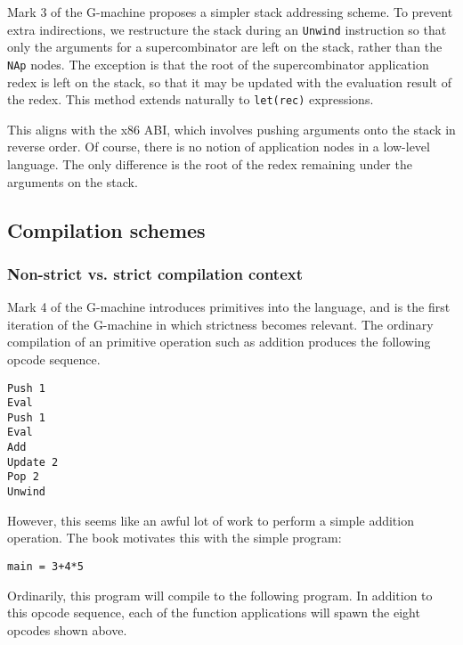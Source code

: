 Mark 3 of the G-machine proposes a simpler stack addressing scheme. To prevent extra indirections, we restructure the stack during an \texttt{Unwind} instruction so that only the arguments for a supercombinator are left on the stack, rather than the \texttt{NAp} nodes. The exception is that the root of the supercombinator application redex is left on the stack, so that it may be updated with the evaluation result of the redex. This method extends naturally to \texttt{let(rec)} expressions.

This aligns with the x86 ABI, which involves pushing arguments onto the stack in reverse order. Of course, there is no notion of application nodes in a low-level language. The only difference is the root of the redex remaining under the arguments on the stack.

\subsection{Compilation schemes}
\label{sec:compilation-schemes}



\subsubsection{Non-strict vs. strict compilation context}
\label{sec:strict-context}

Mark 4 of the G-machine introduces primitives into the language, and is the first iteration of the G-machine in which strictness becomes relevant. The ordinary compilation of an primitive operation such as addition produces the following opcode sequence.

\begin{verbatim}
Push 1
Eval
Push 1
Eval
Add
Update 2
Pop 2
Unwind
\end{verbatim}

However, this seems like an awful lot of work to perform a simple addition operation. The book motivates this with the simple program:

\begin{verbatim}
main = 3+4*5
\end{verbatim}

Ordinarily, this program will compile to the following program. In addition to this opcode sequence, each of the function applications will spawn the eight opcodes shown above.

